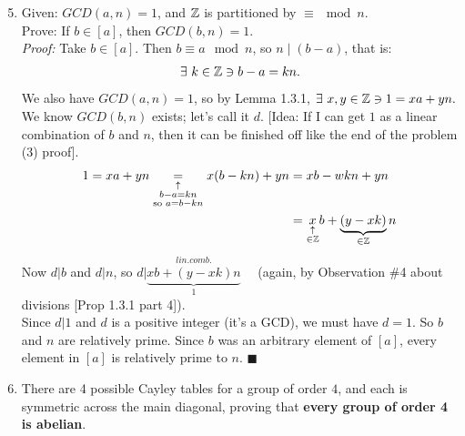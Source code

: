 \begin{enumerate}
    \setcounter{enumi}{4} %

    \item Given: $GCD(a, n) = 1$, and ${\mathbb{ Z}}$ is partitioned by $\equiv \mod n$.  \\
          Prove: If $b \in [a]$, then $GCD(b, n) = 1$. \\

          \textit{Proof:}  
          Take $b \in [a]$. Then $b \equiv a \mod{n}$, so $n \mid (b - a)$, that is:
          \[
          \exists \ k \in {\mathbb{ Z}} \ni b - a = kn.
          \]
          We also have $GCD(a, n) = 1$, so by Lemma 1.3.1, $\exists \ x, y \in {\mathbb{ Z}} \ni 1 = xa + yn.$ \\
          We know $GCD(b, n)$ exists; let's call it $d$. [Idea: If I can get $1$ as a linear combination of $b$ and $n$, then it can be finished off like the end of the problem (3) proof]. 
          \begin{align*}
            1 = xa+yn \underset{\substack{\uparrow \\ b-a=kn \\ \text{so }a=b-kn}}{=} x(b-kn)+yn &= xb-wkn+yn \\
            &= \underset{\substack{\uparrow \\ \in {\mathbb{ Z}}}}{x}b+ \underbrace{(y-xk)}_{\in {\mathbb{ Z}}}n
          \end{align*}
          Now $d|b$ and $d|n$, so $d| \underbrace{\overset{\substack{lin. comb.}}{xb+(y-xk)n}}_{1}$ \ \ (again, by Observation \#4 about divisions [Prop 1.3.1 part 4]). \\
          Since $d|1$ and $d$ is a positive integer (it's a GCD), we must have $d = 1$. So $b$ and $n$ are relatively prime. Since $b$ was an arbitrary element of $[a]$, every element in $[a]$ is relatively prime to $n$. $\blacksquare$

    \item There are 4 possible Cayley tables for a group of order $4$, and each is symmetric across the main diagonal, proving that \textbf{every group of order 4 is abelian}.


\end{enumerate}
